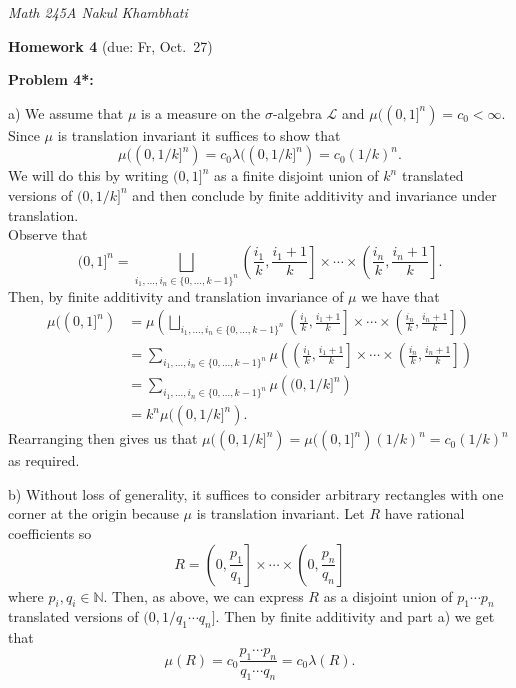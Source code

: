 \documentclass[12pt]{amsart} %
\def\N{\mathbb{N}}
\begin{document}
\thispagestyle{empty}
\pagestyle{empty}
\noindent 
\textsl{Math 245A  \hfill Nakul Khambhati}

\bigskip\bigskip
\centerline {\textbf{Homework 4} (due: Fr, Oct.~27) }

 
\bigskip
\noindent
\textbf{Problem 4*:} 


a) We assume that $\mu$ is a measure on the $\sigma$-algebra $\mathcal{L}$ and $\mu((0,1]^n)= c_0 < \infty$. Since $\mu$ is translation invariant it suffices to show that $$\mu((0,1/k]^n) =c_0 \lambda((0, 1/k]^n) = c_0 (1/k)^n.$$  We will do this by writing $(0,1]^n$ as a finite disjoint union of $k^n$ translated versions of  $(0,1/k]^n$ and then conclude by finite additivity and invariance under translation. \\
Observe that $$(0,1]^n = \bigsqcup_{i_1,\ldots,i_n \in  \{0,\ldots,k-1\}^n}\left( \frac{i_1}{k}, \frac{i_1 +1}{k} \right] \times \cdots \times \left( \frac{i_n}{k}, \frac{i_n +1}{k}\right].$$ Then, by finite additivity and translation invariance of $\mu$ we have that 
\begin{align*}
	\mu((0,1]^n) &=\mu \left( \bigsqcup_{i_1,\ldots,i_n \in  \{0,\ldots,k-1\}^n}\left( \frac{i_1}{k}, \frac{i_1 +1}{k} \right] \times \cdots \times \left( \frac{i_n}{k}, \frac{i_n +1}{k}\right] \right)\\
		     &=  \sum_{i_1,\ldots,i_n \in  \{0,\ldots,k-1\}^n} \mu\left(\left( \frac{i_1}{k}, \frac{i_1 +1}{k} \right] \times \cdots \times \left( \frac{i_n}{k}, \frac{i_n +1}{k}\right]\right) \\
		     &=  \sum_{i_1,\ldots,i_n \in  \{0,\ldots,k-1\}^n} \mu\left((0,1/k]^n\right)\\
		     &= k^n \mu((0,1/k]^n).
\end{align*}
Rearranging then gives us that $\mu((0,1/k]^n) = \mu((0,1]^n)(1/k)^n = c_0(1/k)^n$ as required. 


\smallskip
b) Without loss of generality, it suffices to consider arbitrary rectangles with one corner at the origin because $\mu$ is translation invariant. Let $R$ have rational coefficients so $$R = \left(0, \frac{p_1}{q_1}\right] \times \cdots \times \left(0, \frac{p_n}{q_n}\right]$$ where  $p_i, q_i \in \N$. Then, as above, we can express $R$ as a disjoint union of  $p_1\cdots p_n$ translated versions of  $(0, 1/q_1\cdots q_n]$. Then by finite additivity and part a) we get that  $$\mu(R) = c_0\frac{p_1\cdots p_n}{q_1 \cdots q_n} = c_0 \lambda(R).$$
\end{document}

